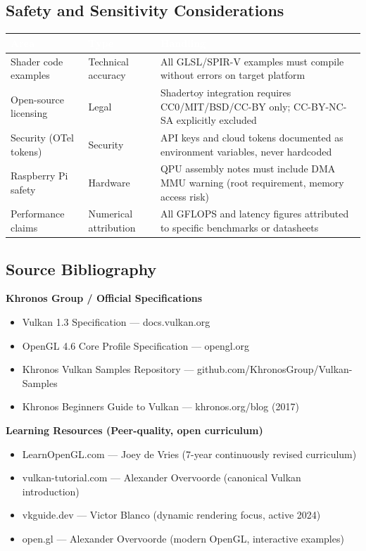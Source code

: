 \documentclass[11pt,letterpaper]{article}
\newcommand{\tableheader}[1]{\textbf{\sffamily\textcolor{white}{#1}}}
\begin{document}
\subsection{Safety and Sensitivity Considerations}

\begin{center}
\begin{tabularx}{\textwidth}{L{4cm}L{2.5cm}X}
\toprule
{}
\tableheader{Area} & \tableheader{Type} & \tableheader{Handling} \\
\midrule
Shader code examples & Technical accuracy & All GLSL/SPIR-V examples must compile without errors on target platform \\
Open-source licensing & Legal & Shadertoy integration requires CC0/MIT/BSD/CC-BY only; CC-BY-NC-SA explicitly excluded \\
Security (OTel tokens) & Security & API keys and cloud tokens documented as environment variables, never hardcoded \\
Raspberry Pi safety & Hardware & QPU assembly notes must include DMA MMU warning (root requirement, memory access risk) \\
Performance claims & Numerical attribution & All GFLOPS and latency figures attributed to specific benchmarks or datasheets \\
\bottomrule
\end{tabularx}
\end{center}

\subsection{Source Bibliography}

\textbf{Khronos Group / Official Specifications}
\begin{itemize}[noitemsep]
  \item Vulkan 1.3 Specification — docs.vulkan.org
  \item OpenGL 4.6 Core Profile Specification — opengl.org
  \item Khronos Vulkan Samples Repository — github.com/KhronosGroup/Vulkan-Samples
  \item Khronos Beginners Guide to Vulkan — khronos.org/blog (2017)
\end{itemize}

\textbf{Learning Resources (Peer-quality, open curriculum)}
\begin{itemize}[noitemsep]
  \item LearnOpenGL.com — Joey de Vries (7-year continuously revised curriculum)
  \item vulkan-tutorial.com — Alexander Overvoorde (canonical Vulkan introduction)
  \item vkguide.dev — Victor Blanco (dynamic rendering focus, active 2024)
  \item open.gl — Alexander Overvoorde (modern OpenGL, interactive examples)
\end{itemize}
\end{document}
